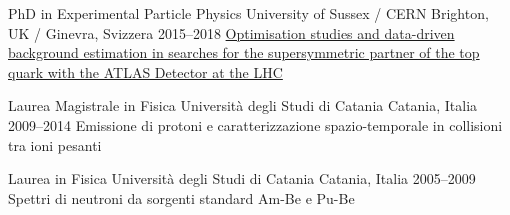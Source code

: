 






\begin{cventries}

  \cventry
      {PhD in Experimental Particle Physics}
      {University of Sussex / CERN}
      {Brighton, UK / Ginevra, Svizzera}
      {2015--2018}
      {
      \href{http://cds.cern.ch/record/2650559?ln=en}
      {Optimisation studies and data-driven background estimation in searches for the 
      supersymmetric partner of the top quark with the ATLAS Detector at the LHC}
      }

  \cventry
      {Laurea Magistrale in Fisica}
      {Università degli Studi di Catania}
      {Catania, Italia}
      {2009--2014}
      {Emissione di protoni e caratterizzazione spazio-temporale in collisioni tra ioni pesanti}
      
  \cventry
      {Laurea in Fisica}
      {Università degli Studi di Catania}
      {Catania, Italia}
      {2005--2009}
      {Spettri di neutroni da sorgenti standard Am-Be e Pu-Be}
\end{cventries}
